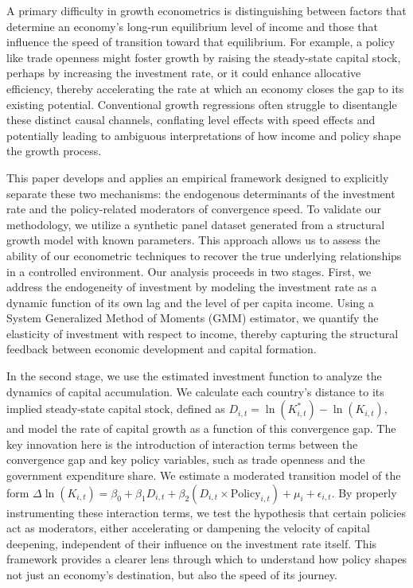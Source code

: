 \documentclass[]{article}
\begin{document}
A primary difficulty in growth econometrics is distinguishing between factors that determine an economy's long-run equilibrium level of income and those that influence the speed of transition toward that equilibrium. For example, a policy like trade openness might foster growth by raising the steady-state capital stock, perhaps by increasing the investment rate, or it could enhance allocative efficiency, thereby accelerating the rate at which an economy closes the gap to its existing potential. Conventional growth regressions often struggle to disentangle these distinct causal channels, conflating level effects with speed effects and potentially leading to ambiguous interpretations of how income and policy shape the growth process.

This paper develops and applies an empirical framework designed to explicitly separate these two mechanisms: the endogenous determinants of the investment rate and the policy-related moderators of convergence speed. To validate our methodology, we utilize a synthetic panel dataset generated from a structural growth model with known parameters. This approach allows us to assess the ability of our econometric techniques to recover the true underlying relationships in a controlled environment. Our analysis proceeds in two stages. First, we address the endogeneity of investment by modeling the investment rate as a dynamic function of its own lag and the level of per capita income. Using a System Generalized Method of Moments (GMM) estimator, we quantify the elasticity of investment with respect to income, thereby capturing the structural feedback between economic development and capital formation.

In the second stage, we use the estimated investment function to analyze the dynamics of capital accumulation. We calculate each country's distance to its implied steady-state capital stock, defined as $D_{i,t} = \ln(K^*_{i,t}) - \ln(K_{i,t})$, and model the rate of capital growth as a function of this convergence gap. The key innovation here is the introduction of interaction terms between the convergence gap and key policy variables, such as trade openness and the government expenditure share. We estimate a moderated transition model of the form $\Delta \ln(K_{i,t}) = \beta_0 + \beta_1 D_{i,t} + \beta_2 (D_{i,t} \times \text{Policy}_{i,t}) + \mu_i + \epsilon_{i,t}$. By properly instrumenting these interaction terms, we test the hypothesis that certain policies act as moderators, either accelerating or dampening the velocity of capital deepening, independent of their influence on the investment rate itself. This framework provides a clearer lens through which to understand how policy shapes not just an economy's destination, but also the speed of its journey.
\end{document}
